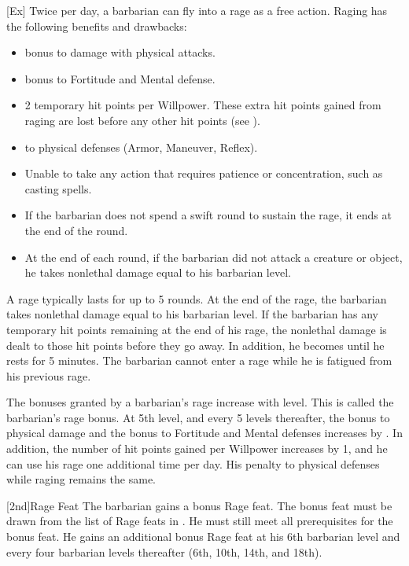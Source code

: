         [Ex]
        Twice per day, a barbarian can fly into a rage as a free action.
        Raging has the following benefits and drawbacks:
        \begin{itemize}
            \item {} bonus to damage with physical attacks.
            \item {} bonus to Fortitude and Mental defense.
            \item 2 temporary hit points per Willpower.
                These extra hit points gained from raging are lost before any other hit points (see ).
            \item {} to physical defenses (Armor, Maneuver, Reflex).
            \item Unable to take any action that requires patience or concentration, such as casting spells.
            \item If the barbarian does not spend a swift round to sustain the rage, it ends at the end of the round.
            \item At the end of each round, if the barbarian did not attack a creature or object, he takes nonlethal damage equal to his barbarian level.
        \end{itemize}

        A rage typically lasts for up to 5 rounds.
        At the end of the rage, the barbarian takes nonlethal damage equal to his barbarian level.
        If the barbarian has any temporary hit points remaining at the end of his rage, the nonlethal damage is dealt to those hit points before they go away.
        In addition, he becomes \fatigued until he rests for 5 minutes.
        The barbarian cannot enter a rage while he is fatigued from his previous rage.

        The bonuses granted by a barbarian's rage increase with level.
        This is called the barbarian's rage bonus.
        At 5th level, and every 5 levels thereafter, the bonus to physical damage and the bonus to Fortitude and Mental defenses increases by .
        In addition, the number of hit points gained per Willpower increases by 1, and he can use his rage one additional time per day.
        His penalty to physical defenses while raging remains the same.

        [2nd]{Rage Feat}
        The barbarian gains a bonus Rage feat.
        The bonus feat must be drawn from the list of Rage feats in .
        He must still meet all prerequisites for the bonus feat.
        He gains an additional bonus Rage feat at his 6th barbarian level and every four barbarian levels thereafter (6th, 10th, 14th, and 18th).


